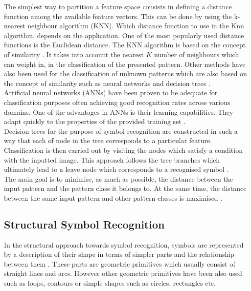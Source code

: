 The simplest way to partition a feature space consists in defining a distance function among the available feature vectors. This can be done by using the k-nearest neighbour algorithm (KNN). Which distance function to use in the Knn algorithm, depends on the application. One of the most popularly used distance functions is the Euclidean distance. The KNN algorithm is based on the concept of similarity \cite{Llados}. It takes into account the nearest $K$ number of neighbours which can weight in, in the classification of the presented pattern. Other methods have also been used for the classification of unknown patterns which are also based on the concept of similarity such as neural networks \cite{ANNS} and decision trees \cite{decisiontrees}.\\

Artificial neural networks (ANNs) have been proven to be adequate for classification purposes often achieving good recognition rates across various domains. One of the advantages in ANNs is their learning capabilities. They adapt quickly to the properties of the provided training set \cite{Llados}. \\

Decision trees for the purpose of symbol recognition are constructed in such a way that each of node in the tree corresponds to a particular feature. Classification is then carried out by visiting the nodes which satisfy a condition with the inputted image. This approach follows the tree branches which ultimately lead to a leave node which corresponds to a recognised symbol \cite{Llados}. \\

The main goal is to minimise, as much as possible, the distance between the input pattern and the pattern class it belongs to. At the same time, the distance between the same input pattern and other pattern classes is maximised \cite{Llados}.

\subsection{Structural Symbol Recognition}
In the structural approach towards symbol recognition, symbols are represented by a description of their shape in terms of simpler parts and the relationship between them \cite{Llados}. These parts are geometric primitives \cite{zernike} which usually consist of straight lines and arcs. However other geometric primitives have been also used such as loops, contours or simple shapes such as circles, rectangles etc. \\

